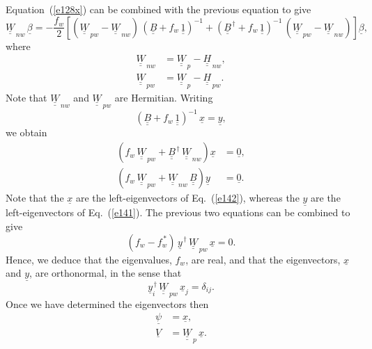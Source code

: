 \documentclass[12pt,prb,aps,notitlepage]{revtex4-1}
\begin{document}
Equation~(\ref{e128x}) can be combined with the previous equation to give
\begin{equation}
\underline{\underline{W}}_{\,nw}\,\underline{\beta} = -\frac{f_w}{2}
\left[ (\underline{\underline{W}}_{\,pw} - \underline{\underline{W}}_{\,nw} )\,(\underline{\underline{B}}+f_w\,\underline{\underline{1}})^{-1} + (\underline{\underline{B}}^{\,\dag}+f_w\,
\underline{\underline{1}})^{-1}\,( \underline{\underline{W}}_{\,pw} - \underline{\underline{W}}_{\,nw} )\right]\underline{\beta},
\end{equation}
where
\begin{align}
\underline{\underline{W}}_{\,nw}  &= \underline{\underline{W}}_{\,p}-\underline{\underline{H}}_{\,nw},\\[0.5ex]
\underline{\underline{W}}_{\,pw}  &= \underline{\underline{W}}_{\,p}-\underline{\underline{H}}_{\,pw}.
\end{align}
Note that $\underline{\underline{W}}_{\,nw}$ and $\underline{\underline{W}}_{\,pw}$ are Hermitian.
Writing
\begin{equation}
(\underline{\underline{B}}+f_w\,\underline{\underline{1}})^{-1} \,\underline{x}= \underline{y},
\end{equation}
we obtain
\begin{align}\label{e141}
\left(f_w\,\underline{\underline{W}}_{\,pw}
+\underline{\underline{B}}^{\,\dag}\,\underline{\underline{W}}_{\,nw}\right)\underline{x}&=\underline{0},\\[0.5ex]
\left(f_w\,\underline{\underline{W}}_{\,pw}
+\underline{\underline{W}}_{\,nw}\,\underline{\underline{B}}\right)\underline{y} &=\underline{0}.\label{e142}
\end{align}
Note that the $\underline{x}$ are the left-eigenvectors of Eq.~(\ref{e142}), whereas the $\underline{y}$ are the left-eigenvectors of Eq.~(\ref{e141}). 
The previous two equations can be combined to give
\begin{equation}
(f_w-f_w^{\,\ast})\,\underline{y}^{\,\dag}\,\underline{\underline{W}}_{\,pw}\,\underline{x} = 0.
\end{equation}
Hence, we deduce that the eigenvalues, $f_w$,  are real, and that the eigenvectors, $\underline{x}$ and $\underline{y}$,  are orthonormal, in the sense that
\begin{equation}
\underline{y}_i^{\,\dag}\,
\underline{\underline{W}}_{\,pw}\,\underline{x}_j= \delta_{ij}.
\end{equation} 
Once we have determined the eigenvectors then
\begin{align}
\underline{\psi} &=\underline{x},\\[0.5ex]
\underline{V} &= \underline{\underline{W}}_{\,p} \,\underline{x}.
\end{align}
\end{document}

